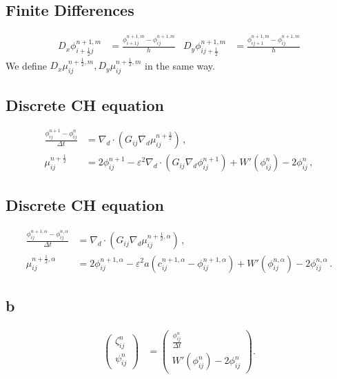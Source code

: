 \documentclass[11pt]{article}
\begin{document}
\subsection*{Finite Differences}
\label{sec:org89a6614}
\begin{align}
D_x\phi^{n+1,m}_{i+\frac{1}{2} j} &= \frac{\phi^{n+1,m}_{i+1j} - \phi^{n+1,m}_{ij}}{h} & D_y\phi^{n+1,m}_{ij+\frac{1}{2}} &= \frac{\phi^{n+1,m}_{ij+1} - \phi^{n+1,m}_{ij}}{h}
\end{align}
We define \(D_x\mu_{ij}^{n+\frac{1}{2},m} , D_y\mu_{ij}^{n+\frac{1}{2},m}\) in the same way.
\subsection*{Discrete CH equation}
\label{sec:orge3cb03d}
\begin{equation}
\label{eq:discrete-cahn-hilliard}
\begin{aligned}
\frac{\phi_{ij}^{n+1} - \phi_{ij}^n}{\Delta t}  &=  \nabla _d \cdot (G_{ij} \nabla_d \mu_{ij}^{n+\frac{1}{2}} )  \,, \\
 \mu_{ij}^{n+\frac{1}{2}} &= 2\phi_{ij}^{n+1} - \varepsilon^2  \nabla_d \cdot  (G_{ij} \nabla _d \phi_{ij}^{n+1} ) + W'(\phi_{ij}^n) - 2\phi _{ij}^n \,,
\end{aligned}
\end{equation}
\subsection*{Discrete CH equation}
\label{sec:org2083b10}
\begin{equation}
\label{eq:discrete-relaxed-cahn-hilliard}
\begin{aligned}
\frac{\phi_{ij}^{n+1,\alpha} - \phi_{ij}^{n,\alpha}}{\Delta t}  &=  \nabla _d \cdot (G_{ij} \nabla_d \mu_{ij}^{n+\frac{1}{2},\alpha} )  \,,\\
 \mu_{ij}^{n+\frac{1}{2},\alpha} &= 2\phi_{ij}^{n+1,\alpha} - \varepsilon^2 a(c_{ij}^{n+1,\alpha} - \phi_{ij}^{n+1,\alpha})  + W'(\phi_{ij}^{n,\alpha}) - 2\phi _{ij}^{n,\alpha} \,.
\end{aligned}
\end{equation}
\subsection*{b}
\label{sec:org8b0c089}
\begin{align*}
\begin{pmatrix}
\zeta^n_{ij}
 \\
\psi^n_{ij}
\end{pmatrix}
&=
\begin{pmatrix}
\frac{\phi_{ij}^{n}}{\Delta t}\\
W'(\phi_{ij}^n) - 2\phi_{ij}^n
\end{pmatrix}
.
\end{align*}
\end{document}
